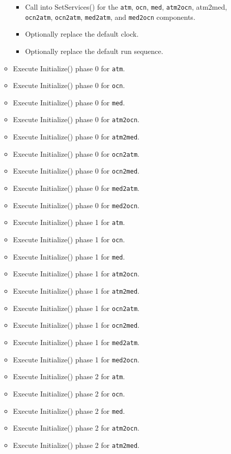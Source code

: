 \begin{itemize}
\begin{itemize}
  \begin{itemize}
    \item Call into SetServices() for the {\tt atm}, {\tt ocn}, {\tt med}, {\tt atm2ocn}, {atm2med}, {\tt ocn2atm}, {\tt ocn2atm}, {\tt med2atm}, and {\tt med2ocn} components.
    \item Optionally replace the default clock. 
    \item Optionally replace the default run sequence.
  \end{itemize}
  \item Execute Initialize() phase 0 for {\tt atm}.
  \item Execute Initialize() phase 0 for {\tt ocn}.
  \item Execute Initialize() phase 0 for {\tt med}.
  \item Execute Initialize() phase 0 for {\tt atm2ocn}.
  \item Execute Initialize() phase 0 for {\tt atm2med}.
  \item Execute Initialize() phase 0 for {\tt ocn2atm}.
  \item Execute Initialize() phase 0 for {\tt ocn2med}.
  \item Execute Initialize() phase 0 for {\tt med2atm}.
  \item Execute Initialize() phase 0 for {\tt med2ocn}.
  \item Execute Initialize() phase 1 for {\tt atm}.
  \item Execute Initialize() phase 1 for {\tt ocn}.
  \item Execute Initialize() phase 1 for {\tt med}.
  \item Execute Initialize() phase 1 for {\tt atm2ocn}.
  \item Execute Initialize() phase 1 for {\tt atm2med}.
  \item Execute Initialize() phase 1 for {\tt ocn2atm}.
  \item Execute Initialize() phase 1 for {\tt ocn2med}.
  \item Execute Initialize() phase 1 for {\tt med2atm}.
  \item Execute Initialize() phase 1 for {\tt med2ocn}.
  \item Execute Initialize() phase 2 for {\tt atm}.
  \item Execute Initialize() phase 2 for {\tt ocn}.
  \item Execute Initialize() phase 2 for {\tt med}.
  \item Execute Initialize() phase 2 for {\tt atm2ocn}.
  \item Execute Initialize() phase 2 for {\tt atm2med}.

\end{itemize}
\end{itemize}
